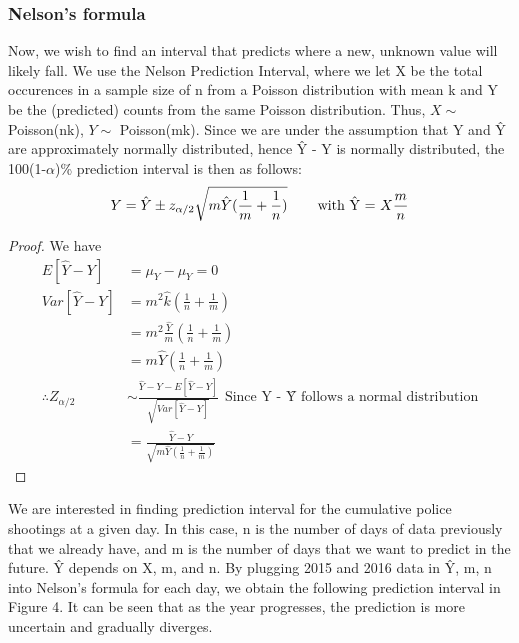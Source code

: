 \documentclass[12pt, titlepage]{article}
\begin{document}
\subsubsection{Nelson's formula}
Now, we wish to find an interval that predicts where a new, unknown value will likely fall. We use the Nelson Prediction Interval\cite{Nelson}, where we let X be the total occurences in a sample size of n from a Poisson distribution with mean k and Y be the (predicted) counts from the same Poisson distribution. Thus, $X \sim$ Poisson(nk), $Y \sim$ Poisson(mk). Since we are under the assumption that Y and \^{Y} are approximately normally distributed, hence \^{Y} - Y is normally distributed, the 100(1-$\alpha$)\% prediction interval is then as follows: 
\begin{equation}
  Y = \hat{Y} \pm z_{\alpha/2}\sqrt{m\hat{Y}(\frac{1}{m} + \frac{1}{n})} \hspace{5ex} \text{with \^{Y} = } X \frac{m}{n}
\end{equation}

\begin{proof}
We have
\begin{equation*}
\begin{split}
E[\hat{Y} - Y] & = \mu_Y - \mu_Y = 0 \\
Var[\hat{Y} - Y] & = m^2\hat{k}(\frac{1}{n} + \frac{1}{m}) \\
& = m^2 \frac{\hat{Y}}{m}(\frac{1}{n} + \frac{1}{m})\\
& = m\hat{Y}(\frac{1}{n} + \frac{1}{m}) \\
\therefore Z_{\alpha/2} & \sim \frac{\hat{Y} - Y - E[\hat{Y} - Y]}{\sqrt{Var[\hat{Y} - Y]}} \hspace{5pt}\text{Since Y - \^{Y} follows a normal distribution} \\
& = \frac{\hat{Y} - Y}{\sqrt{m\hat{Y}(\frac{1}{n} + \frac{1}{m})}}
\end{split}
\end{equation*}
\end{proof}

We are interested in finding prediction interval for the cumulative police shootings at a given day. In this case, n is the number of days of data previously that we already have, and m is the number of days that we want to predict in the future. \^{Y} depends on X, m, and n. By plugging 2015 and 2016 data in \^{Y}, m, n into Nelson's formula for each day, we obtain the following prediction interval in Figure 4. It can be seen that as the year progresses, the prediction is more uncertain and gradually diverges.
\end{document}
